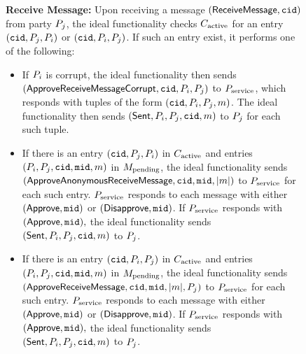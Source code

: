 \begin{figure*}
\begin{tcolorbox}[enhanced,sharp corners,colback=white,boxrule=0.3mm,left=1mm]
\begin{itemize}
		\end{itemize}

		\medskip
		{\bf Receive Message:} Upon receiving a message $(\mathsf{ReceiveMessage}, \mathtt{cid})$ from party $P_j$, the ideal functionality checks $C_{\text{active}}$ for an entry $(\mathtt{cid}, P_j, P_i)$ or $(\mathtt{cid}, P_i, P_j)$.  If such an entry exist, it performs one of the following:
		\begin{itemize}
			\item If $P_i$ is corrupt, the ideal functionality then sends $(\mathsf{ApproveReceiveMessageCorrupt}, \mathtt{cid}, P_i, P_j)$ to $P_{\text{service}}$, which responds with tuples of the form $(\mathtt{cid}, P_i, P_j, m)$. The ideal functionality then sends $(\mathsf{Sent}, P_i, P_j, \mathtt{cid}, m)$ to $P_j$ for each such tuple.

			\item If there is an entry $(\mathtt{cid}, P_j, P_i)$ in $C_{\text{active}}$ and entries $(P_i, P_j, \mathtt{cid}, \mathtt{mid}, m)$ in $M_{\text{pending}}$, the ideal functionality sends $(\mathsf{ApproveAnonymousReceiveMessage}, \mathtt{cid}, \mathtt{mid}, |m|)$ to $P_{\text{service}}$ for each such entry.  $P_{\text{service}}$ responds to each message with either $(\mathsf{Approve}, \mathtt{mid})$ or $(\mathsf{Disapprove}, \mathtt{mid})$. If $P_{\text{service}}$ responds with $(\mathsf{Approve}, \mathtt{mid}),$ the ideal functionality sends $(\mathsf{Sent}, P_i, P_j, \mathtt{cid}, m)$ to $P_j$.

			\item If there is an entry $(\mathtt{cid}, P_i, P_j)$ in $C_{\text{active}}$ and entries $(P_i, P_j, \mathtt{cid}, \mathtt{mid}, m)$ in $M_{\text{pending}}$, the ideal functionality sends $(\mathsf{ApproveReceiveMessage}, \mathtt{cid}, \mathtt{mid}, |m|, P_j)$ to $P_{\text{service}}$ for each such entry.  $P_{\text{service}}$ responds to each message with either $(\mathsf{Approve}, \mathtt{mid})$ or $(\mathsf{Disapprove}, \mathtt{mid})$. If $P_{\text{service}}$ responds with $(\mathsf{Approve}, \mathtt{mid}),$ the ideal functionality sends $(\mathsf{Sent}, P_i, P_j, \mathtt{cid}, m)$ to $P_j$.
		\end{itemize}


\end{tcolorbox}
\end{figure*}
